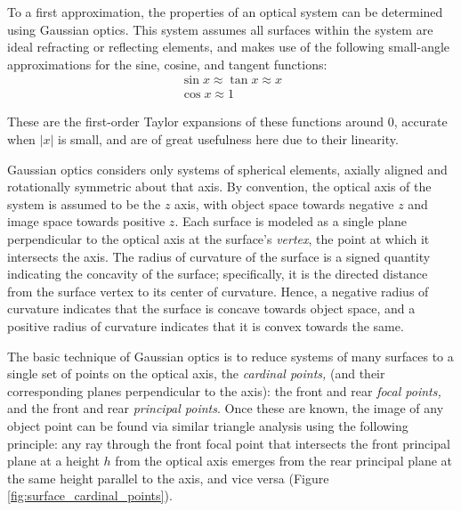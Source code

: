 \documentclass[twocolumn]{article}
\begin{document}
To a first approximation, the properties of an optical system can be determined
using Gaussian optics. This system assumes all surfaces within the system are
ideal refracting or reflecting elements, and makes use of the following
small-angle approximations for the sine, cosine, and tangent functions:
\begin{gather*}
  \sin x \approx \tan x \approx x \\
  \cos x \approx 1
\end{gather*}

These are the first-order Taylor expansions of these functions around 0,
accurate when $|x|$ is small, and are of great usefulness here due to their
linearity.

Gaussian optics considers only systems of spherical elements, axially aligned and
rotationally symmetric about that axis. By convention, the optical axis of the
system is assumed to be the $z$ axis,
with object space towards negative $z$ and image space towards positive $z$. Each surface
is modeled as a single plane perpendicular to the optical axis at the surface's \emph{vertex},
the point at which it intersects the axis. The radius of curvature of the surface is a
signed quantity indicating the concavity of the surface; specifically, it is the
directed distance from the surface vertex to its center of curvature. Hence, a negative
radius of curvature indicates that the surface is concave towards object space, and a
positive radius of curvature indicates that it is convex towards the same.

The basic technique of Gaussian optics is to reduce systems of many surfaces to a single
set of points on the optical axis, the \emph{cardinal points,} (and their corresponding
planes perpendicular to the axis): the front and rear \emph{focal points,} and the front and rear \emph{principal points}. Once these are known, the image of any object point can be found
via similar triangle analysis using the following
principle: any ray through the front focal point that intersects the front principal plane
at a height $h$ from the optical axis emerges from the rear principal plane at the same
height parallel to the axis, and vice versa (Figure \ref{fig:surface_cardinal_points}).
\end{document}
